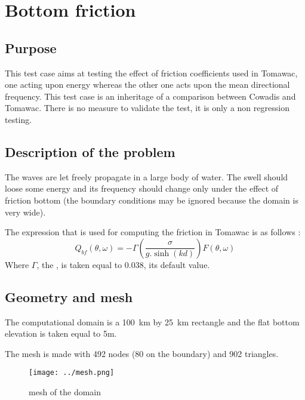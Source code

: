 \section{Bottom friction}
%

%
\subsection{Purpose}
%
This test case aims at testing the effect of friction coefficients used in Tomawac, one acting upon energy whereas the other one acts upon the mean directional frequency. This test case is an inheritage of a comparison between Cowadis and Tomawac. There is no measure to validate the test, it is only a non regression testing.



%
\subsection{Description of the problem}
The waves are let freely propagate in a large body of water. The swell should loose some energy and its frequency should change only under the effect of friction bottom (the boundary conditions may be ignored because the domain is very wide).

The expression that is used for computing the friction in Tomawac is as follows :
\begin{equation}
Q_{bf}(\theta,\omega)=-\Gamma \left(\frac{\sigma}{g.\sinh(kd)}\right)F(\theta,\omega)
\end{equation}
Where $\Gamma$, the , is taken equal to 0.038, its default value.

\subsection{Geometry and mesh}
The computational domain is a 100~km by 25~km rectangle and the flat bottom elevation is taken equal to 5m.

The mesh is made with 492 nodes (80 on the boundary) and 902 triangles.

\begin{figure} [!h]
\centering
\texttt{[image: ../mesh.png]}
 \caption{mesh of the domain}\label{mailbf}
\end{figure}

